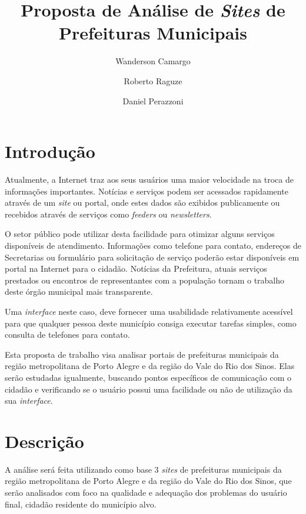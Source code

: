 \documentclass{article}
\title{Proposta de Análise de \textit{Sites} de Prefeituras Municipais}
\author{Wanderson Camargo\inst{1}\and{}Roberto Raguze\inst{1}\and{}Daniel
Perazzoni\inst{1}}
\begin{document}
\maketitle{}

\section{Introdução}

Atualmente, a Internet traz aos seus usuários uma maior velocidade na troca de
informações importantes. Notícias e serviços podem ser acessados rapidamente
através de um \textit{site} ou portal, onde estes dados são exibidos
publicamente ou recebidos através de serviços como \textit{feeders} ou
\textit{newsletters}.

O setor público pode utilizar desta facilidade para otimizar alguns serviços
disponíveis de atendimento. Informações como telefone para contato, endereços de
Secretarias ou formulário para solicitação de serviço poderão estar disponíveis
em portal na Internet para o cidadão. Notícias da Prefeitura, atuais serviços
prestados ou encontros de representantes com a população tornam o trabalho deste
órgão municipal mais transparente.

Uma \textit{interface} neste caso, deve fornecer uma usabilidade relativamente
acessível para que qualquer pessoa deste município consiga executar tarefas
simples, como consulta de telefones para contato.

Esta proposta de trabalho visa analisar portais de prefeituras municipais da
região metropolitana de Porto Alegre e da região do Vale do Rio dos Sinos. Elas
serão estudadas igualmente, buscando pontos específicos de comunicação com o
cidadão e verificando se o usuário possui uma facilidade ou não de utilização da
sua \textit{interface}.

\section{Descrição}

A análise será feita utilizando como base 3 \textit{sites} de prefeituras
municipais da região metropolitana de Porto Alegre e da região do Vale do Rio
dos Sinos, que serão analisados com foco na qualidade e adequação dos problemas
do usuário final, cidadão residente do município alvo.
\end{document}
